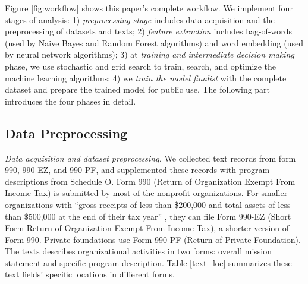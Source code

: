\documentclass[11pt]{article}
\begin{document}
Figure \ref{fig:workflow} shows this paper's complete workflow. We implement four stages of analysis: 1) \textit{preprocessing stage} includes data acquisition and the preprocessing of datasets and texts; 2) \textit{feature extraction} includes bag-of-words (used by Naive Bayes and Random Forest algorithms) and word embedding (used by neural network algorithms); 3) at \textit{training and intermediate decision making} phase, we use stochastic and grid search to train, search, and optimize the machine learning algorithms; 4) we \textit{train the model finalist} with the complete dataset and prepare the trained model for public use. The following part introduces the four phases in detail.

\subsection{Data Preprocessing}



\textit{Data acquisition and dataset preprocessing.} We collected text records from form 990, 990-EZ, and 990-PF, and supplemented these records with program descriptions from Schedule O. Form 990 (Return of Organization Exempt From Income Tax) is submitted by most of the nonprofit organizations. For smaller organizations with ``gross receipts of less than \$200,000 and total assets of less than \$500,000 at the end of their tax year'' \parencite[1]{USInternalRevenueService2017InstructionsForm2018}, they can file Form 990-EZ (Short Form Return of Organization Exempt From Income Tax), a shorter version of Form 990. Private foundations use Form 990-PF (Return of Private Foundation). The texts describes organizational activities in two forms: overall mission statement and specific program description. Table \ref{text_loc} summarizes these text fields' specific locations in different forms.
\end{document}
